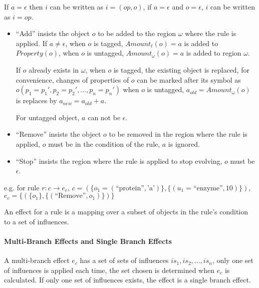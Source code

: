 \documentclass[9pt,a4paper,twoside]{article}
\begin{document}
                If $a = \epsilon$ then $i$ can be written as $i = (op, o)$, if $a = \epsilon$ and $o =\epsilon$,  $i$
                can be written as $i=op$. 
                \begin{itemize}
                    \item ``Add'' insists the object $o$ to be added to the region $\omega$ where the rule is applied. 
                        If $a \neq \epsilon$, 
                            when $o$ is tagged, $Amount_t(o) = a$ is added to $Property(o)$, 
                            when $o$ is untagged, $Amount_\omega(o) = a$ is added to region $\omega$. 
                      
                        If $o$ already exists in $\omega$,
                            when $o$ is tagged, the existing object is replaced, for convenience, changes of properties of $o$ can be marked after
                            its symbol as $o(p_1 = p_1', p_2 = p_2',..., p_n = p_n')$
                            when $o$ is untagged, $a_{old} = Amount_\omega(o)$ is replaces by $a_{new} = a_{old} + a$.
                                  
                        For untagged object, $a$ can not be $\epsilon$. 
                
                    \item ``Remove'' insists the object $o$ to be removed in the region where the rule is applied, $o$ must be in the condition of the rule, $a$ is ignored.
                    
                    \item ``Stop'' insists the region where the rule is applied to stop evolving, $o$ must be $\epsilon$.
                \end{itemize}
                
                e.g. for rule $r: c \rightarrow e_c$, $c = (\{ o_1=(\text{``protein''}, \text{'a'}) \}, \{(u_1=\text{``enzyme''}, 10)\})$, 
                $e_c = \{ (\{o_1\}, \{(\text{``Remove''}, o_1)\})\} $
            
                An effect for a rule is a mapping over a subset of objects in the rule's condition to a set of influences.

            \paragraph{Multi-Branch Effects and Single Branch Effects}
            A multi-branch effect $e_c$ has a set of sets of influences ${is_1, is_2, ..., is_n}$, only one set of influences is applied each time, the set chosen is determined when $e_c$ is calculated. If only one set of influences exists, the effect is a single branch effect.
                
\end{document}
